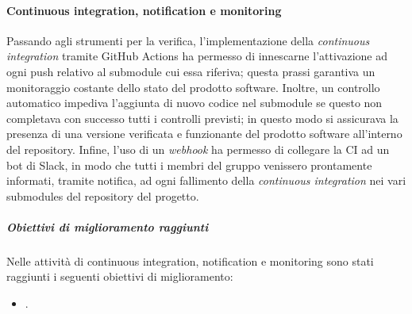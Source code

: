 			\paragraph{Continuous integration, notification e monitoring}
				Passando agli strumenti per la verifica, l'implementazione della \textit{continuous integration} tramite GitHub Actions ha permesso di innescarne l'attivazione ad ogni push relativo al submodule cui essa riferiva; questa prassi garantiva un monitoraggio costante dello stato del prodotto software. Inoltre, un controllo automatico impediva l'aggiunta di nuovo codice nel submodule se questo non completava con successo tutti i controlli previsti; in questo modo si assicurava la presenza di una versione verificata e funzionante del prodotto software all'interno del repository. Infine, l'uso di un \textit{webhook} ha permesso di collegare la CI ad un bot di Slack, in modo che tutti i membri del gruppo venissero prontamente informati, tramite notifica, ad ogni fallimento della \textit{continuous integration} nei vari submodules del repository del progetto.
				
				\subparagraph{Obiettivi di miglioramento raggiunti}
					Nelle attività di continuous integration, notification e monitoring sono stati raggiunti i seguenti obiettivi di miglioramento:
					\begin{itemize}
						\item .
					\end{itemize}

